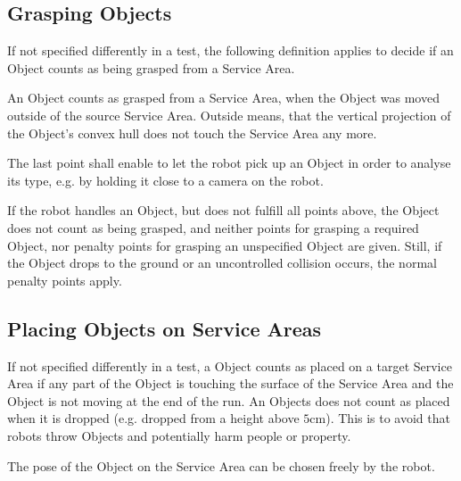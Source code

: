 
\subsection{Grasping Objects} \label{ssec:GraspingObjects}
If not specified differently in a test, the following definition applies to decide if an Object counts as being grasped from a Service Area.
\par
An Object counts as grasped from a Service Area, when the Object was moved outside of the source Service Area. Outside means, that the vertical projection of the Object's convex hull does not touch the Service Area any more.

\par
The last point shall enable to let the robot pick up an Object in order to analyse its type, e.g. by holding it close to a camera on the robot.
\par
If the robot handles an Object, but does not fulfill all points above, the Object does not count as being grasped, and neither points for grasping a required Object, nor penalty points for grasping an unspecified Object are given. Still, if the Object drops to the ground or an uncontrolled collision occurs, the normal penalty points apply.


\subsection{Placing Objects on Service Areas} \label{ssec:PlacingObjects}
If not specified differently in a test, a Object counts as placed on a target Service Area if any part of the Object is touching the surface of the Service Area and the Object is not moving at the end of the run. An Objects does not count as placed when it is dropped (e.g. dropped from a height above $5\si{\centi\meter}$). This is to avoid that robots throw Objects and potentially harm people or property.
\par
The pose of the Object on the Service Area can be chosen freely by the robot.

